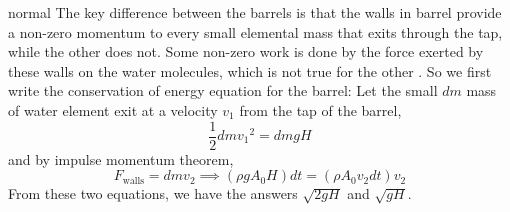 \begin{solution}{normal}
The key difference between the barrels is that the walls in barrel provide a non-zero momentum to every small elemental mass that exits through the tap, while the other does not. Some non-zero work is done by the force exerted by these walls on the water molecules, which is not true for the other . So we first write the conservation of energy equation for the barrel: Let the small $dm$ mass of water element exit at a velocity $v_1$ from the tap of the barrel,$$\frac{1}{2} dm {v_1}^2 = dm g H$$and by impulse momentum theorem,$$F_{\text{walls}} = dm v_2 \implies (\rho g A_0 H)dt = (\rho A_0 v_2 dt) v_2$$From these two equations, we have the answers $\boxed{\sqrt{2gH}}$ and $\boxed{\sqrt{gH}}$.
\end{solution}
